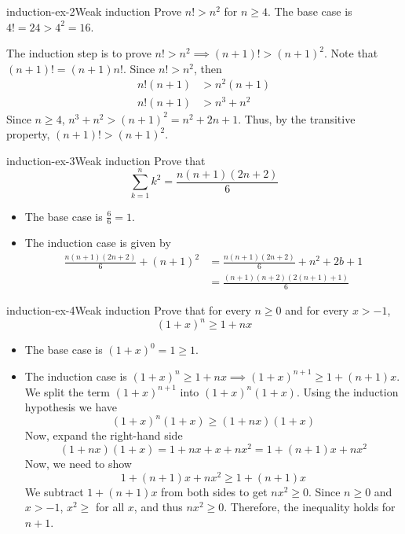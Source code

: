 \documentclass[preview]{standalone}
\begin{document}
\begin{snippetexercise}{induction-ex-2}{Weak induction}
    Prove \(n! > n^2\) for \(n \geq 4\).
    The base case is \(4!=24 > 4^2 = 16\).

    The induction step is to prove \(n! > n^2 \implies (n +1)! > {(n+1)}^2\).
    Note that \((n+1)!=(n+1)n!\).
    Since \(n! > n^2\), then
    \begin{align*}
        n!(n+1) &> n^2(n+1) \\
        n!(n+1) &> n^3 + n^2
    \end{align*}
    Since \(n \geq 4\), \(n^3 + n^2 > {(n+1)}^2=n^2+2n+1\).
    Thus, by the transitive property, \((n+1)! > {(n+1)}^2\).
\end{snippetexercise}

\begin{snippetexercise}{induction-ex-3}{Weak induction}
    Prove that
    \[
        \sum_{k=1}^n k^2 = \frac{n(n+1)(2n+2)}{6}
    \]
    \begin{itemize}
        \item The base case is \(\frac{6}{6}=1\).
        \item The induction case is given by
        \begin{align*}
            \frac{n(n+1)(2n+2)}{6} + {(n+1)}^2  &= \frac{n(n+1)(2n+2)}{6} + n^2 + 2b + 1 \\
            &= \frac{(n+1)(n+2)(2(n+1)+1)}{6}
        \end{align*}
    \end{itemize}
\end{snippetexercise}

\begin{snippetexercise}{induction-ex-4}{Weak induction}
    Prove that for every \(n \geq 0\) and for every \(x > -1\),
    \[
        {(1+x)}^n \geq 1 + nx
    \]
    \begin{itemize}
        \item The base case is \({(1+x)}^0 = 1 \geq 1\).
        \item The induction case is \({(1+x)}^n \geq 1 + nx \implies {(1+x)}^{n+1} \geq 1 + (n+1)x\).
            We split the term \({(1+x)}^{n+1}\) into \({(1+x)}^n(1+x)\).
            Using the induction hypothesis we have \[{(1+x)}^n(1+x) \geq (1+nx)(1+x)\]
            Now, expand the right-hand side \[(1+nx)(1+x) = 1 + nx + x + nx^2 = 1 + (n+1)x + nx^2\]
            Now, we need to show \[1+(n+1)x + nx^2 \geq 1 + (n+1)x\]
            We subtract \(1+(n+1)x\) from both sides to get \(nx^2 \geq 0\).
            Since \(n \geq 0\) and \(x > -1\), \(x^2 \geq \) for all \(x\), and thus \(nx^2 \geq 0\).
            Therefore, the inequality holds for \(n+1\). 
    \end{itemize}
\end{snippetexercise}
\end{document}
